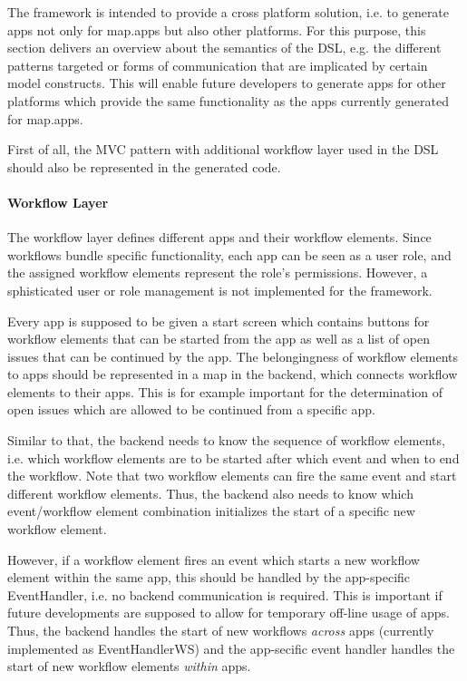 
The \MD framework is intended to provide a cross platform solution, i.e. to generate apps not only for map.apps but also other platforms. For this purpose, this section delivers an overview about the semantics of the DSL, e.g. the different patterns targeted or forms of communication that are implicated by certain model constructs. This will enable future developers to generate apps for other platforms which provide the same functionality as the apps currently generated for map.apps.

First of all, the MVC pattern with additional workflow layer used in the DSL should also be represented in the generated code.

\paragraph{Workflow Layer}
The workflow layer defines different apps and their workflow elements. Since workflows bundle specific functionality, each app can be seen as a user role, and the assigned workflow elements represent the role's permissions. However, a sphisticated user or role management is not implemented for the \MD framework.

Every app is supposed to be given a start screen which contains buttons for workflow elements that can be started from the app as well as a list of open issues that can be continued by the app. The belongingness of workflow elements to apps should be represented in a map in the backend, which connects workflow elements to their apps. This is for example important for the determination of open issues which are allowed to be continued from a specific app.

Similar to that, the backend needs to know the sequence of workflow elements, i.e. which workflow elements are to be started after which event and when to end the workflow. Note that two workflow elements can fire the same event and start different workflow elements. Thus, the backend also needs to know which event/workflow element combination initializes the start of a specific new workflow element.

However, if a workflow element fires an event which starts a new workflow element within the same app, this should be handled by the app-specific EventHandler, i.e. no backend communication is required. This is important if future developments are supposed to allow for temporary off-line usage of apps. Thus, the backend handles the start of new workflows \textit{across} apps (currently implemented as EventHandlerWS) and the app-secific event handler handles the start of new workflow elements \textit{within} apps.

